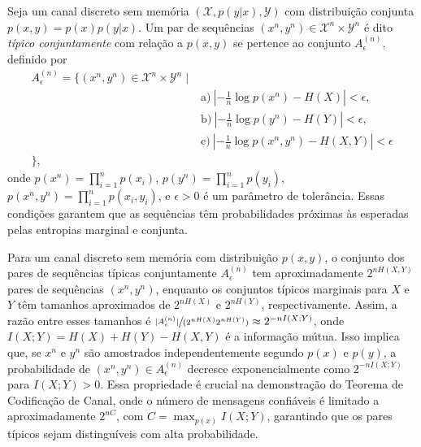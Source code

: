 \begin{definition}
Seja um canal discreto sem memória $(\mathcal{X}, p(y|x), \mathcal{Y})$ com 
distribuição conjunta $p(x,y) = p(x)p(y|x)$. Um par de sequências 
$(x^n, y^n) \in \mathcal{X}^n \times \mathcal{Y}^n$ é dito \emph{típico conjuntamente} 
com relação a $p(x,y)$ se pertence ao conjunto $A_{\epsilon}^{(n)}$, definido por
\begin{align*}
  A_{\epsilon}^{(n)} = \Big\{ (x^n, y^n) \in \mathcal{X}^n \times \mathcal{Y}^n \mid \\
&\text{a)} \ \left| -\frac{1}{n} \log p(x^n) - H(X) \right| < \epsilon, \\
&\text{b)} \ \left| -\frac{1}{n} \log p(y^n) - H(Y) \right| < \epsilon, \\
&\text{c)} \ \left| -\frac{1}{n} \log p(x^n, y^n) - H(X,Y) \right| < \epsilon \\ 
\Big\},
\end{align*}
onde $p(x^n) = \prod_{i=1}^n p(x_i)$, $p(y^n) = \prod_{i=1}^n p(y_i)$, 
$p(x^n, y^n) = \prod_{i=1}^n p(x_i, y_i)$, e $\epsilon > 0$ é um parâmetro de tolerância. 
Essas condições garantem que as sequências têm probabilidades próximas às esperadas pelas entropias marginal e conjunta.
\end{definition}


\begin{remark}
Para um canal discreto sem memória com distribuição $p(x,y)$, o conjunto
dos pares de sequências típicas conjuntamente $A_{\epsilon}^{(n)}$ tem aproximadamente $2^{nH(X,Y)}$
pares de sequências $(x^n, y^n)$, enquanto os conjuntos típicos marginais para
$X$ e $Y$ têm tamanhos aproximados de $2^{nH(X)}$ e $2^{nH(Y)}$,
respectivamente. Assim, a razão entre esses tamanhos é 
$\sfrac{|A_{\epsilon}^{(n)}|}{(2^{nH(X)} 2^{nH(Y)})} \approx 2^{-nI(X;Y)}$, 
onde $I(X;Y) = H(X) + H(Y) - H(X,Y)$ 
é a informação mútua. Isso implica que, se $x^n$ e $y^n$ são amostrados
independentemente segundo $p(x)$ e $p(y)$, a probabilidade de 
$(x^n, y^n) \in A_{\epsilon}^{(n)}$ decresce exponencialmente como $2^{-nI(X;Y)}$ 
para $I(X;Y) > 0$. Essa propriedade é crucial na demonstração do Teorema de Codificação de
Canal, onde o número de mensagens confiáveis é limitado a aproximadamente
$2^{nC}$, com $C = \max_{p(x)} I(X;Y)$, garantindo que os pares típicos sejam
distinguíveis com alta probabilidade.
\end{remark}


